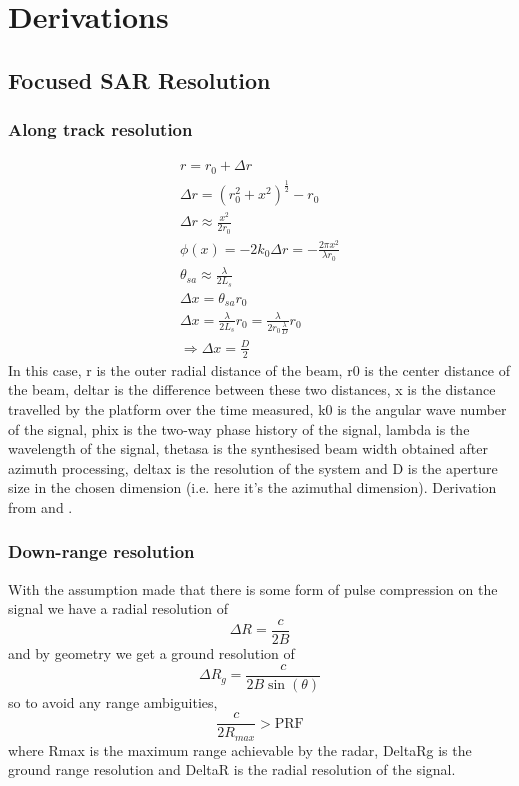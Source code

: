 \appendix
\chapter{Derivations}
\label{appen:derivations}
\section{Focused SAR Resolution}
\subsection{Along track resolution}
\begin{gather}
	r = r_0 + \Delta r \\
	\Delta r = (r_0^2 + x^2) ^ \frac{1}{2} - r_0\\
	\Delta r \approx \frac{x^2}{2r_0}\\
	\phi(x) = -2k_0 \Delta r = -\frac{2\pi x^2}{\lambda r_0}\\
	\theta _{sa} \approx \frac{\lambda}{2L_s}\\
	\Delta x = \theta _{sa}r_0\\
	\Delta x = \frac{\lambda}{2L_s}r_0 = \frac{\lambda}{2r_0\frac{\lambda}{D}} r_0\\
	\Rightarrow \Delta x = \frac{D}{2}
\end{gather}
In this case, \gls{r} is the outer radial distance of the beam, \gls{r0} is the center distance of the beam, \gls{deltar} is the difference between these two distances, \gls{x} is the distance travelled by the platform over the time measured, \gls{k0} is the angular wave number of the signal, \gls{phix} is the two-way phase history of the signal, \gls{lambda} is the wavelength of the signal, \gls{thetasa} is the synthesised beam width obtained after azimuth processing, \gls{deltax} is the resolution of the system and \gls{D} is the aperture size in the chosen dimension (i.e. here it's the azimuthal dimension). Derivation from \cite{richardsRemoteSensingImaging2009} and \cite{watsonEE40136RadarSystems2020}.
\subsection{Down-range resolution}

With the assumption made that there is some form of pulse compression on the signal we have a radial resolution of \[\Delta R = \frac{c}{2B}\] and by geometry we get a ground resolution of \[\Delta R_g = \frac{c}{2B\sin(\theta)}\] so to avoid any range ambiguities, \[\frac{c}{2R_{max}} > \text{PRF} \] where \gls{Rmax} is the maximum range achievable by the radar, \gls{DeltaRg} is the ground range resolution and \gls{DeltaR} is the radial resolution of the signal.
